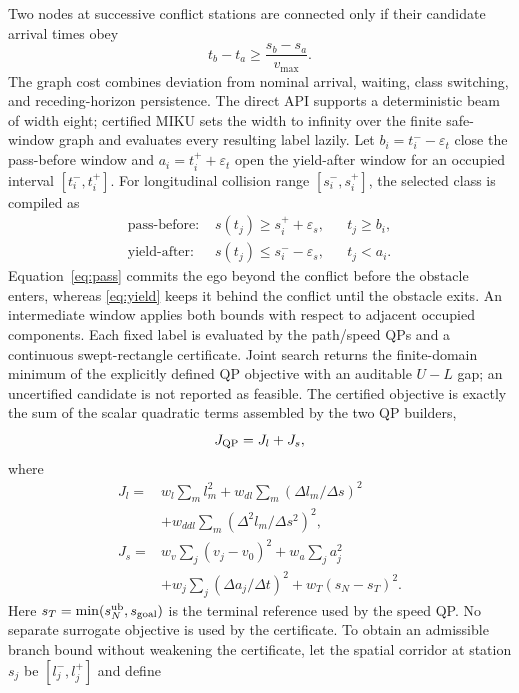 Two nodes at successive conflict stations are connected only if their candidate arrival times obey
\begin{equation}
 t_b-t_a\ge\frac{s_b-s_a}{v_{\max}}.
 \label{eq:causal}
\end{equation}
The graph cost combines deviation from nominal arrival, waiting, class switching, and receding-horizon persistence. The direct API supports a deterministic beam of width eight; certified MIKU sets the width to infinity over the finite safe-window graph and evaluates every resulting label lazily. Let $b_i=t_i^- -\varepsilon_t$ close the pass-before window and $a_i=t_i^+ +\varepsilon_t$ open the yield-after window for an occupied interval $[t_i^-,t_i^+]$. For longitudinal collision range $[s_i^-,s_i^+]$, the selected class is compiled as
\begin{align}
 \text{pass-before: }&s(t_j)\ge s_i^++\varepsilon_s, &&t_j\ge b_i,\label{eq:pass}\\
 \text{yield-after: }&s(t_j)\le s_i^--\varepsilon_s, &&t_j<a_i.
 \label{eq:yield}
\end{align}
Equation~\eqref{eq:pass} commits the ego beyond the conflict before the obstacle enters, whereas \eqref{eq:yield} keeps it behind the conflict until the obstacle exits. An intermediate window applies both bounds with respect to adjacent occupied components. Each fixed label is evaluated by the path/speed QPs and a continuous swept-rectangle certificate. Joint search returns the finite-domain minimum of the explicitly defined QP objective with an auditable $U-L$ gap; an uncertified candidate is not reported as feasible.
The certified objective is exactly the sum of the scalar quadratic terms assembled by the two QP builders,
\begin{equation}
J_{\rm QP}=J_l+J_s,
\end{equation}
where
\begin{align}
J_l={}&w_l\sum_m l_m^2+w_{dl}\sum_m(\Delta l_m/\Delta s)^2\\
       &+w_{ddl}\sum_m(\Delta^2 l_m/\Delta s^2)^2,\\
 J_s={}&w_v\sum_j(v_j-v_0)^2+w_a\sum_j a_j^2\\
       &+w_j\sum_j(\Delta a_j/\Delta t)^2
       +w_T(s_N-s_T)^2 .
\label{eq:qp-objective}
\end{align}
Here $s_T=\min(s_N^{\rm ub},s_{\rm goal})$ is the terminal reference used by the speed QP. No separate surrogate objective is used by the certificate.
To obtain an admissible branch bound without weakening the certificate, let the spatial corridor at station $s_j$ be $[l_j^-,l_j^+]$ and define
